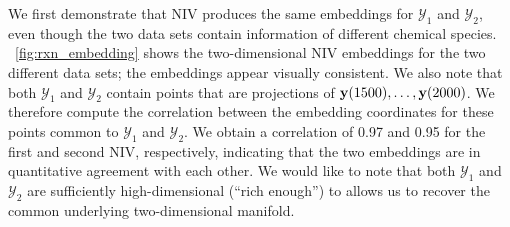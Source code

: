 We first demonstrate that NIV produces the same embeddings for $\mathcal{Y}_1$ and $\mathcal{Y}_2$, even though the two data sets contain information of different chemical species.
%
\fig~\ref{fig:rxn_embedding} shows the two-dimensional NIV embeddings for the two different data sets; the embeddings appear visually consistent.
%
We also note that both $\mathcal{Y}_1$ and $\mathcal{Y}_2$ contain points that are projections of $\mathbf{y}(1500), \dots, \mathbf{y}(2000)$.
%
We therefore compute the correlation between the embedding coordinates for these points common to $\mathcal{Y}_1$ and $\mathcal{Y}_2$.
%
We obtain a correlation of 0.97 and 0.95 for the first and second NIV, respectively, indicating that the two embeddings are in quantitative
agreement with each other.
%
We would like to note that both $\mathcal{Y}_1$ and $\mathcal{Y}_2$ are sufficiently high-dimensional (``rich enough'') to allows us to recover
the common underlying two-dimensional manifold.
%
